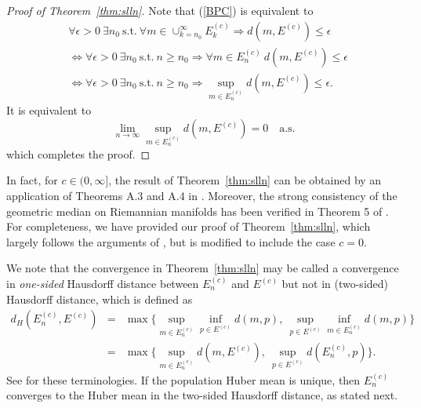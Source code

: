 \documentclass[preprint]{imsart}
\theoremstyle{plain}
\theoremstyle{remark}
\begin{document}
\begin{appendix}
\begin{proof}[Proof of Theorem~\ref{thm:slln}]
Note that (\ref{BPC}) is equivalent to
\begin{eqnarray*}
& \forall \epsilon > 0 ~ \exists n_{0} ~ \mbox{s.t.} ~ \forall m \in \cup_{k=n_0}^{\infty} E^{(c)}_{k} \Rightarrow d(m, E^{(c)}) \le \epsilon \\
&\Leftrightarrow \forall \epsilon > 0 ~ \exists n_{0} ~ \mbox{s.t.} ~ 
n \ge n_0 \Rightarrow \forall m \in E^{(c)}_{n} ~ d(m, E^{(c)}) \le \epsilon \\
&\Leftrightarrow \forall \epsilon > 0 ~ \exists n_{0} ~ \mbox{s.t.} ~ 
n \ge n_0 \Rightarrow \sup_{m \in E^{(c)}_{n}} d(m, E^{(c)}) \le \epsilon.
\end{eqnarray*}
It is equivalent to
\begin{equation*}
\lim_{n \rightarrow \infty} \sup_{m \in E^{(c)}_{n}} d(m, E^{(c)}) = 0 \quad \mbox{a.s.}
\end{equation*}
which completes the proof.
\end{proof}

In fact, for $c \in (0,\infty]$, the result of Theorem~\ref{thm:slln} 
can be obtained by an application of Theorems A.3 and A.4 in \cite{huckemann2011intrinsic}.
Moreover, the strong consistency of the geometric median on Riemannian manifolds has been verified in Theorem 5 of \cite{arnaudon2012medians}. For completeness, we have provided our proof of Theorem~\ref{thm:slln}, which largely follows the arguments of \cite{huckemann2011intrinsic}, but is modified to include the case $c=0$.


We note that the convergence in Theorem~\ref{thm:slln} may be called a convergence in \textit{one-sided} Hausdorff distance between $E^{(c)}_{n}$ and $E^{(c)}$ but not in (two-sided) Hausdorff distance, which is defined as 
\begin{eqnarray}\label{Hausdorff}
d_{H}(E^{(c)}_{n}, E^{(c)}) &=& \max\{\sup_{m \in E^{(c)}_n} \inf_{p \in E^{(c)}} d(m, p),~ \sup_{p \in E^{(c)}} \inf_{m \in E^{(c)}_n} d(m, p)\} \nonumber \\ 
&=& \max\{\sup_{m \in E^{(c)}_n} d(m, E^{(c)}),~ \sup_{p \in E^{(c)}} d(E^{(c)}_{n}, p) \}.
\end{eqnarray}
See \cite{schotz2022strong} for these terminologies.
%
%
If the population Huber mean is unique, then $E^{(c)}_{n}$ converges to the Huber mean in the two-sided Hausdorff distance, as stated next. 



\end{appendix}
\end{document}
